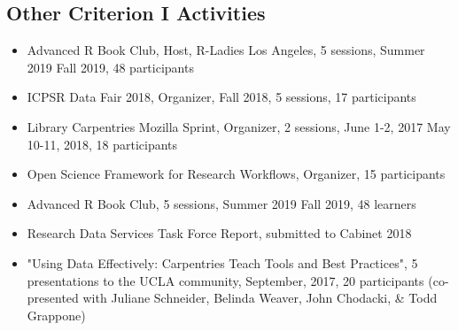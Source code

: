 \subsection{Other Criterion I Activities}
\begin{itemize}[label={},leftmargin=!,labelindent=5pt,itemindent=-15pt]
  \item Advanced R Book Club, Host, R-Ladies Los Angeles, 5 sessions, Summer 2019 \textbar Fall 2019,	48 participants
  \item ICPSR Data Fair 2018, Organizer, Fall 2018, 5 sessions, 17 participants
  \item Library Carpentries Mozilla Sprint, Organizer, 2 sessions, June 1-2, 2017 \textbar May 10-11, 2018, 18 participants
  \item Open Science Framework for Research Workflows, Organizer, 15 participants
  \item Advanced R Book Club, 5 sessions, Summer 2019 \textbar Fall 2019,	48 learners
  \item Research Data Services Task Force Report, submitted to Cabinet 2018
  \item "Using Data Effectively: Carpentries Teach Tools and Best Practices", 5 presentations to the UCLA community, September, 2017,	20 participants (co-presented with Juliane Schneider, Belinda Weaver, John Chodacki, \& Todd Grappone)
\end{itemize}
